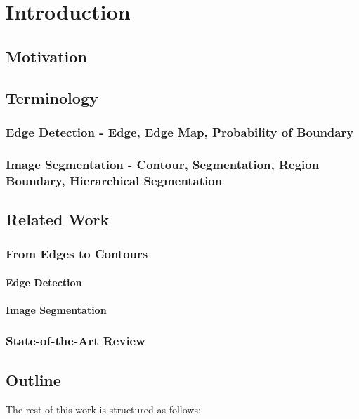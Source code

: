 \chapter{Introduction}
\label{Chapter1}
\section{Motivation}
\section{Terminology}
\subsection{Edge Detection - Edge, Edge Map, Probability of Boundary}
\subsection{Image Segmentation - Contour, Segmentation, Region Boundary, Hierarchical Segmentation}
\section{Related Work}
\subsection{From Edges to Contours}
\subsubsection{Edge Detection}
\subsubsection{Image Segmentation}
\subsection{State-of-the-Art Review}
\section{Outline}
The rest of this work is structured as follows:

